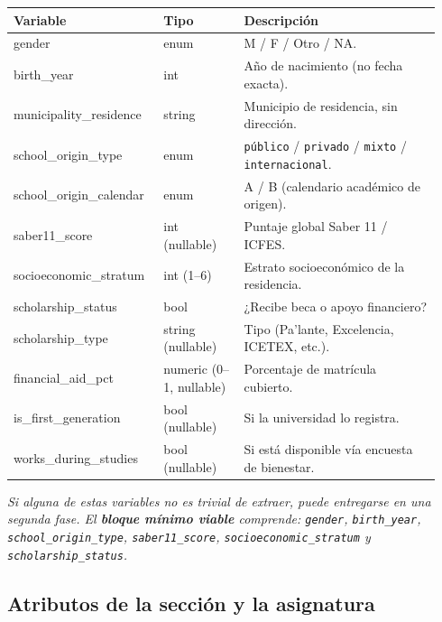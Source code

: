 \documentclass[11pt,a4paper]{article}
\newcommand{\var}[1]{\texttt{\small #1}}
\newcommand{\note}[1]{{\footnotesize\itshape\color{gray} #1}}
\begin{document}
\begin{longtable}{@{}>{\ttfamily}p{0.32\linewidth}p{0.18\linewidth}p{0.44\linewidth}@{}}
\toprule
\rmfamily\textbf{Variable} & \textbf{Tipo} & \textbf{Descripción} \\
\midrule
\endhead
gender                  & enum   & M / F / Otro / NA. \\
birth\_year             & int    & Año de nacimiento (no fecha exacta). \\
municipality\_residence & string & Municipio de residencia, sin dirección. \\
school\_origin\_type    & enum   & \texttt{público} / \texttt{privado} / \texttt{mixto} / \texttt{internacional}. \\
school\_origin\_calendar& enum   & A / B (calendario académico de origen). \\
saber11\_score          & int (nullable) & Puntaje global Saber 11 / ICFES. \\
socioeconomic\_stratum  & int (1--6) & Estrato socioeconómico de la residencia. \\
scholarship\_status     & bool   & ¿Recibe beca o apoyo financiero? \\
scholarship\_type       & string (nullable) & Tipo (Pa'lante, Excelencia, ICETEX, etc.). \\
financial\_aid\_pct     & numeric (0--1, nullable) & Porcentaje de matrícula cubierto. \\
is\_first\_generation   & bool (nullable) & Si la universidad lo registra. \\
works\_during\_studies  & bool (nullable) & Si está disponible vía encuesta de bienestar. \\
\bottomrule
\end{longtable}

\note{Si alguna de estas variables no es trivial de extraer, puede entregarse en una segunda fase. El \textbf{bloque mínimo viable} comprende: \var{gender}, \var{birth\_year}, \var{school\_origin\_type}, \var{saber11\_score}, \var{socioeconomic\_stratum} y \var{scholarship\_status}.}

\subsection{Atributos de la sección y la asignatura}
\end{document}
